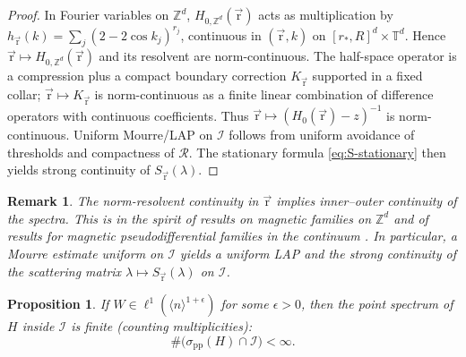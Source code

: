 \documentclass[10pt]{amsart}
\newcommand{\T}{{\mathbb{T}}}
\newcommand{\Z}{{\mathbb{Z}}}
\newcommand{\1}{{\mathbb{I}}}
\newcommand{\Ic}{\mathcal{I}}
\numberwithin{equation}{section}
\newtheorem{proposition}[theorem]{Proposition}%
\newtheorem{remark}[theorem]{Remark}%
\begin{document}
\begin{proof}
In Fourier variables on $\Z^d$, $H_{0,\Z^d}(\vec{\mathrm{r}})$ acts as multiplication by $h_{\vec{\mathrm{r}}}(k)=\sum_j(2-2\cos k_j)^{r_j}$, continuous in $(\vec{\mathrm{r}},k)$ on $[r_*,R]^d\times\T^d$.
Hence $\vec{\mathrm{r}}\mapsto H_{0,\Z^d}(\vec{\mathrm{r}})$ and its resolvent are norm-continuous.
The half-space operator is a compression plus a compact boundary correction $K_{\vec{\mathrm{r}}}$ supported in a fixed collar; $\vec{\mathrm{r}}\mapsto K_{\vec{\mathrm{r}}}$ is norm-continuous as a finite linear combination of difference operators with continuous coefficients.
Thus $\vec{\mathrm{r}}\mapsto (H_{0}(\vec{\mathrm{r}})-z)^{-1}$ is norm-continuous.
Uniform Mourre/LAP on $\Ic$ follows from uniform avoidance of thresholds and compactness of $\mathcal R$.
The stationary formula \eqref{eq:S-stationary} then yields strong continuity of $S_{\vec{\mathrm{r}}}(\lambda)$.
\end{proof}

\begin{remark}
The norm-resolvent continuity in $\vec{\mathrm{r}}$ implies inner--outer continuity of the spectra.
This is in the spirit of results on magnetic families on $\mathbb{Z}^d$ \cite{ParraRichard-Zd}
and of results for magnetic pseudodifferential families in the continuum \cite{AthmouniMantoiuPurice-2010}.
In particular, a Mourre estimate uniform on $\mathcal I$ yields a uniform LAP and the strong continuity of
the scattering matrix $\lambda\mapsto S_{\vec{\mathrm{r}}}(\lambda)$ on $\mathcal I$.
\end{remark}

\begin{proposition}\label{prop:finite-pp}
If $W\in \ell^{1}(\langle n\rangle^{1+\epsilon})$ for some $\epsilon>0$, then
the point spectrum of $H$ inside $\Ic$ is finite (counting multiplicities):
\[
\#\big(\sigma_{\mathrm{pp}}(H)\cap \Ic\big)<\infty.
\]
\end{proposition}
\end{document}
